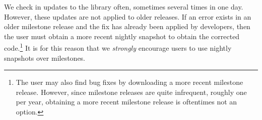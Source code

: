 We check in updates to the library often, sometimes several times in one day.
However, these updates are not applied to older releases.
If an error exists in an older milestone release and the fix has already
been applied by \libflame developers, then the user must obtain
a more recent nightly snapshot to obtain the corrected code.\footnote{The user may also
find bug fixes by downloading a more recent milestone release.
However, since milestone releases are quite infrequent, roughly one per year,
obtaining a more recent milestone release is oftentimes not an option.}
It is for this reason that we {\em strongly} encourage users to use nightly
snapshots over milestones.



